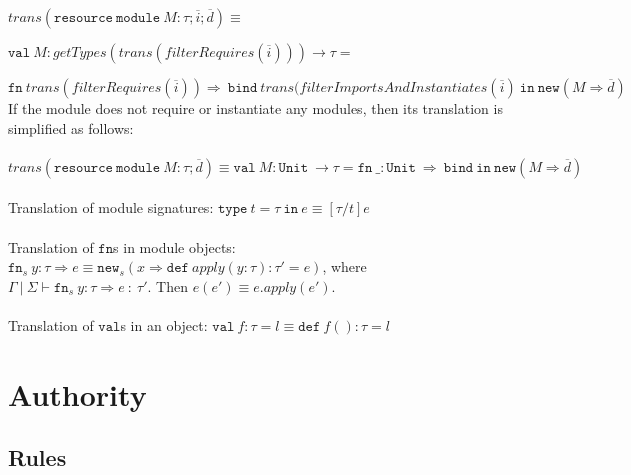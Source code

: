 \documentclass{llncs}
\newcommand{\keywadj}[1]{\mathtt{#1}}
\newcommand{\keyw}[1]{\keywadj{#1}~}
\begin{document}
\noindent$trans(\keyw{resource} \keyw{module} M : \tau; \overline{i}; \overline{d}) \equiv$

$\keyw{val} M : getTypes(trans(filterRequires(\overline{i}))) \rightarrow \tau = $

$\keyw{fn} trans(filterRequires(\overline{i})) \Rightarrow~\keyw{bind} trans(filterImportsAndInstantiates(\overline{i})~\keyw{in} \keywadj{new}(M \Rightarrow \overline{d})$\\

\noindent If the module does not require or instantiate any modules, then its translation is simplified as follows:
\\\\
\noindent$trans(\keyw{resource} \keyw{module} M : \tau; \overline{d}) \equiv \keyw{val} M : \keyw{Unit} \rightarrow \tau = \keyw{fn} \_ : \keyw{Unit} \Rightarrow~\keyw{bind} \keyw{in} \keywadj{new}(M \Rightarrow \overline{d})$
\\\\
Translation of module signatures: $\keyw{type} t = \tau~\keyw{in} e \equiv [\tau / t]e$
\\\\
Translation of $\keywadj{fn}$s in module objects: \mbox{$\keywadj{fn}_s~y : \tau \Rightarrow e \equiv \keywadj{new}_s(x \Rightarrow \keyw{def} apply(y : \tau) : \tau' = e)$}, where \\ \mbox{$\Gamma~|~\Sigma \vdash \keywadj{fn}_s~y : \tau \Rightarrow e~:~\tau'$}. Then $e(e') \equiv e.apply(e')$.
\\\\
Translation of $\keywadj{val}$s in an object: $\keyw{val} f : \tau = l \equiv \keyw{def} f() : \tau = l$

\newpage

\section{Authority}

\subsection{Rules}
\end{document}
